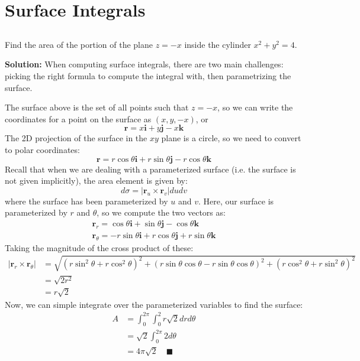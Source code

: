 \documentclass[letterpaper, 11pt]{article}
\begin{document}
\section{Surface Integrals}
\subsection{} Find the area of the portion of the plane $z = -x$ inside the cylinder $x^2+y^2=4$.
\par \textbf{Solution:} When computing surface integrals, there are two main challenges: picking the right formula to compute the integral with, then parametrizing the surface. 

\par The surface above is the set of all points such that $z = -x$, so we can write the coordinates for a point on the surface as $(x,y,-x)$, or
\[ \bm{r} = x \bm{i} + y\bm{j} - x \bm{k} \]
The 2D projection of the surface in the $xy$ plane is a circle, so we need to convert to polar coordinates:
\[ \bm{r} = r \cos \theta \bm{i} + r \sin \theta \bm{j} - r \cos \theta \bm{k} \]
Recall that when we are dealing with a parameterized surface (i.e. the surface is not given implicitly), the area element is given by:
\[ d \sigma = |\bm{r}_u \times \bm{r}_v| du dv \]
where the surface has been parameterized by $u$ and $v$. Here, our surface is parameterized by $r$ and $\theta$, so we compute the two vectors as:
\begin{gather*}
\bm{r}_r = \cos \theta \bm{i} + \sin \theta \bm{j} - \cos \theta \bm{k} \\
\bm{r}_\theta = -r\sin \theta \bm{i} + r \cos \theta \bm{j} + r \sin \theta \bm{k} 
\end{gather*}
Taking the magnitude of the cross product of these:
\begin{align*}
|\bm{r}_r \times \bm{r}_\theta |  &= \sqrt{ (r \sin^2 \theta + r \cos^2 \theta)^2 + (r \sin \theta \cos \theta - r \sin \theta \cos \theta)^2 + (r \cos^2 \theta + r \sin ^2 \theta)^2} \\
&= \sqrt{ 2r^2}\\
&= r \sqrt{2}
\end{align*}
Now, we can simple integrate over the parameterized variables to find the surface:
\begin{align*}
A &= \int_0^{2\pi} \int_0^2 r \sqrt{2}  dr d \theta \\
&= \sqrt{2} \int_0^{2\pi} 2 d \theta \\
&= 4 \pi \sqrt{2}\quad\blacksquare 
\end{align*}
\end{document}
